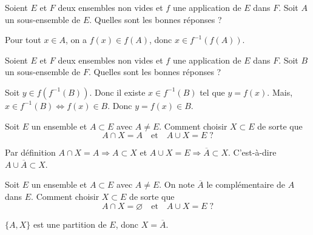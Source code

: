 \begin{question}
Soient $E$ et $F$ deux ensembles non vides et $f$ une application de $E$ dans $F$. Soit $A$ un sous-ensemble de $E$. Quelles sont les bonnes réponses ?
\begin{answers}  
\end{answers}
\begin{explanations}
Pour tout $x\in A$, on a $f(x)\in f(A)$, donc $x\in f^{-1}(f(A))$.
\end{explanations}
\end{question}


\begin{question}
Soient $E$ et $F$ deux ensembles non vides et $f$ une application de $E$ dans $F$. Soit $B$ un sous-ensemble de $F$. Quelles sont les bonnes réponses ?
\begin{answers}  
\end{answers}
\begin{explanations}
Soit $y\in f(f^{-1}(B))$. Donc il existe $x\in f^{-1}(B)$ tel que $y=f(x)$. Mais, $x\in f^{-1}(B)\Leftrightarrow f(x)\in B$. Donc $y=f(x)\in B$.
\end{explanations}
\end{question}



\begin{question}
Soit $E$ un ensemble et $A\subset E$ avec $A\neq E$. Comment choisir $X\subset E$ de sorte que
$$A\cap X=A\quad \mbox{et}\quad A\cup X=E \; ?$$
\begin{answers}  
\end{answers}
\begin{explanations}
Par définition $A\cap X=A\Rightarrow A\subset X$ et $A\cup X=E\Rightarrow \overline{A}\subset X$. C'est-à-dire $A\cup \overline{A}\subset X$.
\end{explanations}
\end{question}



\begin{question}
Soit $E$ un ensemble et $A\subset E$ avec $A\neq E$. On note $\overline{A}$ le complémentaire de $A$ dans $E$. Comment choisir $X\subset E$ de sorte que
$$A\cap X=\varnothing \quad \mbox{et}\quad A\cup X=E \; ?$$
\begin{answers}  
\end{answers}
\begin{explanations}
$\{A,X\}$ est une partition de $E$, donc $X=\overline{A}$.
\end{explanations}
\end{question}



